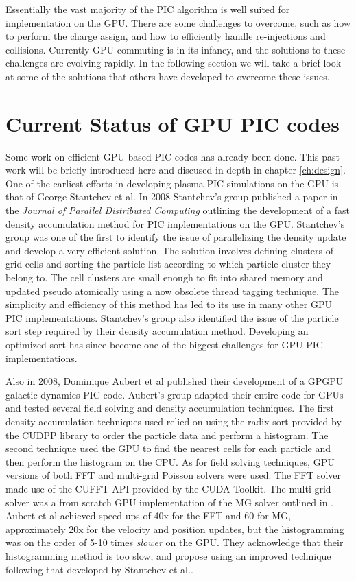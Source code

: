 Essentially the vast majority of the PIC algorithm is well suited for implementation on the GPU. There are some challenges to overcome, such as how to perform the charge assign, and how to efficiently handle re-injections and collisions. Currently GPU commuting is in its infancy, and the solutions to these challenges are evolving rapidly. In the following section we will take a brief look at some of the solutions that others have developed to overcome these issues. 


		\section{Current Status of GPU PIC codes}

						Some work on efficient GPU based PIC codes has already been done. This past work will be briefly introduced here and discused in depth in chapter \ref{ch:design}. One of the earliest efforts in developing plasma PIC simulations on the GPU is that of George Stantchev et al. In 2008 Stantchev's group published a paper in the \emph{Journal of Parallel Distributed Computing} outlining the development of a fast density accumulation method for PIC implementations on the GPU. Stantchev's group was one of the first to identify the issue of parallelizing the density update and develop a very efficient solution. The solution involves defining clusters of grid cells and sorting the particle list according to which particle cluster they belong to. The cell clusters are small enough to fit into shared memory and updated pseudo atomically using a now obsolete thread tagging technique. The simplicity and efficiency of this method has led to its use in many other GPU PIC implementations. Stantchev's group also identified the issue of the particle sort step required by their density accumulation method. Developing an optimized sort has since become one of the biggest challenges for GPU PIC implementations. \cite{Stantchev2008}

Also in 2008, Dominique Aubert et al published their development of a GPGPU galactic dynamics PIC code. Aubert's group adapted their entire code for GPUs and tested several field solving and density accumulation techniques. The first density accumulation techniques used relied on using the radix sort provided by the CUDPP library to order the particle data and perform a histogram. The second technique used the GPU to find the nearest cells for each particle and then perform the histogram on the CPU. As for field solving techniques, GPU versions of both FFT and multi-grid Poisson solvers were used. The FFT solver made use of the CUFFT API provided by the CUDA Toolkit. The multi-grid solver was a from scratch GPU implementation of the MG solver outlined in \cite{NumericalRecipes}. Aubert et al achieved speed ups of 40x for the FFT and 60 for MG, approximately 20x for the velocity and position updates, but the histogramming was on the order of 5-10 times \emph{slower} on the GPU. They acknowledge that their histogramming method is too slow, and propose using an improved technique following that developed by Stantchev et al.\cite{Aubert2009}.

